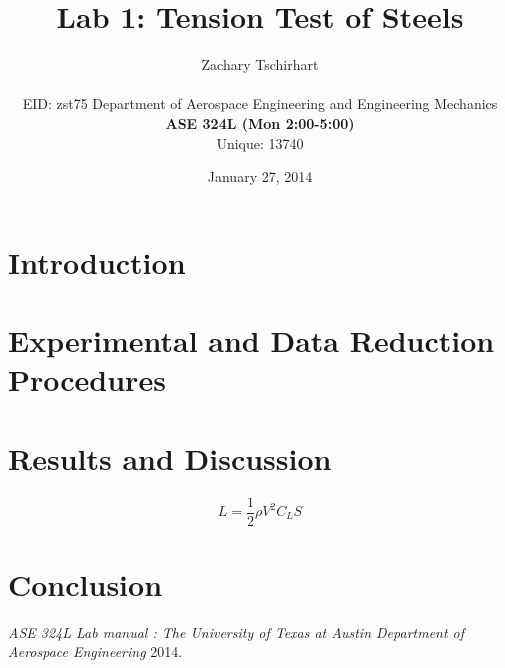 \documentclass[12pt]{report}
\title{Lab 1: Tension Test of Steels}
\author{Zachary Tschirhart \\
	\small \\
        \small EID: zst75
	\small Department of Aerospace Engineering and Engineering Mechanics \\
	\small \textbf{ASE 324L (Mon 2:00-5:00)} \\
	\small Unique: 13740}
\date{January 27, 2014}
\begin{document}
\maketitle

\begin{abstract}

\end{abstract}


\tableofcontents
\pagebreak

\setcounter{secnumdepth}{0}



\section{Introduction}
\doublespacing




\section{Experimental and Data Reduction Procedures}




\section{Results and Discussion}
\doublespacing

\begin{equation}
	L = \frac{1}{2} \rho V^{2} C_{L} S
	\label{equation:equation1}
\end{equation}




\section{Conclusion}
\doublespacing




\begin{thebibliography}{0}
 {\em ASE 324L Lab manual : The University of Texas at Austin Department of Aerospace Engineering}  2014.
\end{thebibliography}
\end{document}
